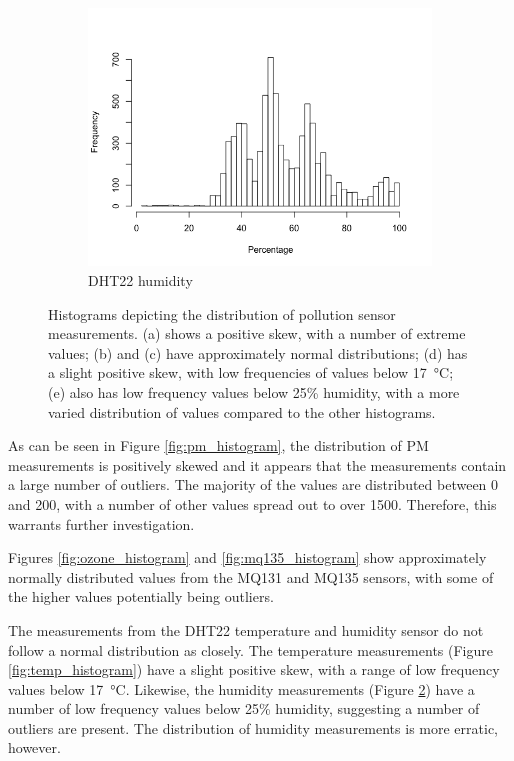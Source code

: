 \documentclass[11pt]{report}
\begin{document}
\begin{figure}[!tbp]
\begin{minipage}{1\linewidth}
        \end{minipage}
    \begin{minipage}{1\linewidth}
    	\centering
        \begin{subfigure}[t]{.5\linewidth}
            \includegraphics[width=\textwidth]{images/humidity_histogram}
            \caption{DHT22 humidity}
            \label{fig:humidity_histogram}
        \end{subfigure}
    \end{minipage}
    \caption{Histograms depicting the distribution of pollution sensor measurements. (a) shows a positive skew, with a number of extreme values; (b) and (c) have approximately normal distributions; (d) has a slight positive skew, with low frequencies of values below \SI{17}{\celsius}; (e) also has low frequency values below 25\% humidity, with a more varied distribution of values compared to the other histograms.}
\end{figure}

As can be seen in Figure \ref{fig:pm_histogram}, the distribution of PM measurements is positively skewed and it appears that the measurements contain a large number of outliers. The majority of the values are distributed between 0 and 200, with a number of other values spread out to over \num{1500}. Therefore, this warrants further investigation.

Figures \ref{fig:ozone_histogram} and \ref{fig:mq135_histogram} show approximately normally distributed values from the MQ131 and MQ135 sensors, with some of the higher values potentially being outliers.

The measurements from the DHT22 temperature and humidity sensor do not follow a normal distribution as closely. The temperature measurements (Figure \ref{fig:temp_histogram}) have a slight positive skew, with a range of low frequency values below \SI{17}{\celsius}. Likewise, the humidity measurements (Figure \ref{fig:humidity_histogram}) have a number of low frequency values below 25\% humidity, suggesting a number of outliers are present. The distribution of humidity measurements is more erratic, however.
\end{document}
